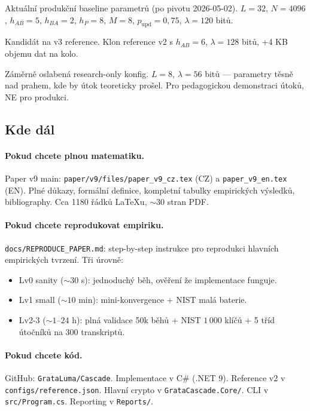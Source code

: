 \documentclass[11pt,a4paper]{article}
\begin{document}
\begin{description}[leftmargin=*, style=nextline]
\item[Reference v2] Aktuální produkční baseline parametrů (po pivotu 2026-05-02). $L=32$, $N=4096$, $h_{AB}=5$, $h_{BA}=2$, $h_P=8$, $M=8$, $p_\text{upd}=0{,}75$, $\lambda=120$ bitů.
\item[\texttt{reference\_h\_AB6}] Kandidát na v3 reference. Klon reference v2 s $h_{AB} = 6$, $\lambda = 128$ bitů, +4 KB objemu dat na kolo.
\item[\texttt{break\_demo}] Záměrně oslabená research-only konfig. $L=8$, $\lambda = 56$ bitů --- parametry těsně nad prahem, kde by útok teoreticky prošel. Pro pedagogickou demonstraci útoků, NE pro produkci.
\end{description}

\subsection{Kde dál}

\paragraph{Pokud chcete plnou matematiku.} Paper v9 main: \texttt{paper/v9/files/paper\_v9\_cz.tex} (CZ) a \texttt{paper\_v9\_en.tex} (EN). Plné důkazy, formální definice, kompletní tabulky empirických výsledků, bibliography. Cca 1180 řádků LaTeXu, $\sim 30$ stran PDF.

\paragraph{Pokud chcete reprodukovat empiriku.} \texttt{docs/REPRODUCE\_PAPER.md}: step-by-step instrukce pro reprodukci hlavních empirických tvrzení. Tři úrovně:
\begin{itemize}[leftmargin=*]
\item Lv0 sanity ($\sim 30$ s): jednoduchý běh, ověření že implementace funguje.
\item Lv1 small ($\sim 10$ min): mini-konvergence + NIST malá baterie.
\item Lv2-3 ($\sim 1$--$24$ h): plná validace 50k běhů + NIST $1\,000$ klíčů + 5 tříd útočníků na 300 transkriptů.
\end{itemize}

\paragraph{Pokud chcete kód.} GitHub: \texttt{GrataLuma/Cascade}. Implementace v C\# (.NET 9). Reference v2 v \texttt{configs/reference.json}. Hlavní crypto v \texttt{GrataCascade.Core/}. CLI v \texttt{src/Program.cs}. Reporting v \texttt{Reports/}.
\end{document}

